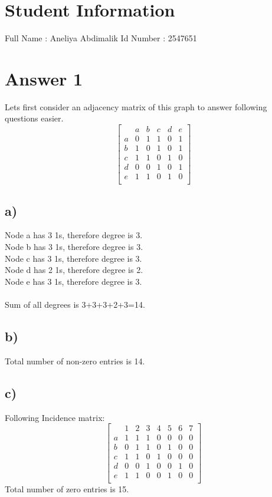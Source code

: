 \documentclass[12pt]{article}
\begin{document}
\section*{Student Information } 
Full Name : Aneliya Abdimalik
Id Number :  2547651

\section*{Answer 1}
Lets first consider an adjacency matrix of this graph to answer following questions easier.
$$
\begin{bmatrix}
&a&b&c&d&e\\
a&0&1&1&0&1\\
b&1&0&1&0&1\\
c&1&1&0&1&0\\
d&0&0&1&0&1\\
e&1&1&0&1&0\\
\end{bmatrix}
$$
\subsection*{a)}
Node a has 3 1s, therefore degree is 3.\\
Node b has 3 1s, therefore degree is 3.\\
Node c has 3 1s, therefore degree is 3.\\
Node d has 2 1s, therefore degree is 2.\\
Node e has 3 1s, therefore degree is 3.\\
\\
Sum of all degrees is 3+3+3+2+3=14.\\
\subsection*{b)}
Total number of non-zero entries is 14.
\subsection*{c)}
Following Incidence matrix:
$$
\begin{bmatrix}
&1&2&3&4&5&6&7\\
a&1&1&1&0&0&0&0\\
b&0&1&1&0&1&0&0\\
c&1&1&0&1&0&0&0\\
d&0&0&1&0&0&1&0\\
e&1&1&0&0&1&0&0\\
\end{bmatrix}
$$
Total number of zero entries is 15.\\
\end{document}
